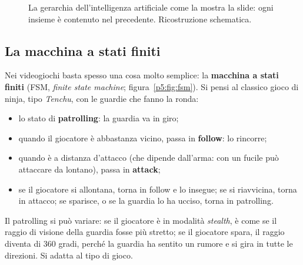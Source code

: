 \begin{figure}[htbp]
\centering
{}
\caption{La gerarchia dell'intelligenza artificiale come la mostra la slide:
ogni insieme è contenuto nel precedente. Ricostruzione schematica.}
\label{p5:fig:ia}
\end{figure}

\subsection{La macchina a stati finiti}

Nei videogiochi basta spesso una cosa molto semplice: la \textbf{macchina a
stati finiti} (FSM, \emph{finite state machine};
figura~\ref{p5:fig:fsm}). Si pensi al classico gioco di ninja, tipo
\emph{Tenchu}, con le guardie che fanno la ronda:
\begin{itemize}
  \item lo stato di \textbf{patrolling}: la guardia va in giro;
  \item quando il giocatore è abbastanza vicino, passa in \textbf{follow}: lo
        rincorre;
  \item quando è a distanza d'attacco (che dipende dall'arma: con un fucile può
        attaccare da lontano), passa in \textbf{attack};
  \item se il giocatore si allontana, torna in follow e lo insegue; se si
        riavvicina, torna in attacco; se sparisce, o se la guardia lo ha
        ucciso, torna in patrolling.
\end{itemize}
Il patrolling si può variare: se il giocatore è in modalità \emph{stealth}, è
come se il raggio di visione della guardia fosse più stretto; se il giocatore
spara, il raggio diventa di 360 gradi, perché la guardia ha sentito un rumore e
si gira in tutte le direzioni. Si adatta al tipo di gioco.

